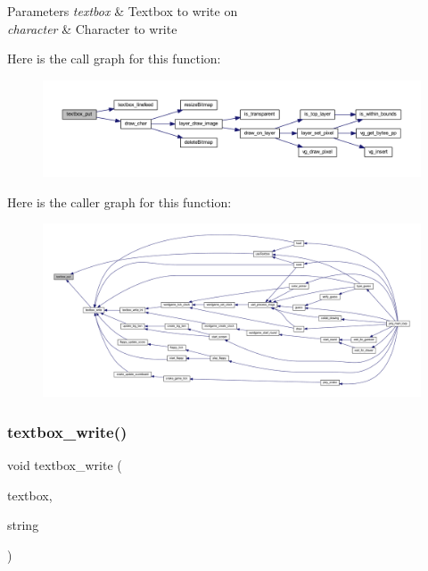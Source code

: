 \begin{DoxyParams}{Parameters}
{\em textbox} & Textbox to write on \\
\hline
{\em character} & Character to write \\
\hline
\end{DoxyParams}
Here is the call graph for this function\+:\nopagebreak
\begin{figure}[H]
\begin{center}
\leavevmode
\includegraphics[width=350pt]{group__textbox_gab3ac8e604e6b7f8b6b4666d687a09716_cgraph}
\end{center}
\end{figure}
Here is the caller graph for this function\+:\nopagebreak
\begin{figure}[H]
\begin{center}
\leavevmode
\includegraphics[width=350pt]{group__textbox_gab3ac8e604e6b7f8b6b4666d687a09716_icgraph}
\end{center}
\end{figure}
\mbox{\label{group__textbox_ga71eed99ce4466e9e7b3ad1b9d61f2312}} 
\subsubsection{\texorpdfstring{textbox\+\_\+write()}{textbox\_write()}}
{\footnotesize\ttfamily void textbox\+\_\+write (\begin{DoxyParamCaption}\item[{\mbox{\hyperlink{struct_text_box}{Text\+Box}} $\ast$}]{textbox,  }\item[{char $\ast$}]{string }\end{DoxyParamCaption})}



